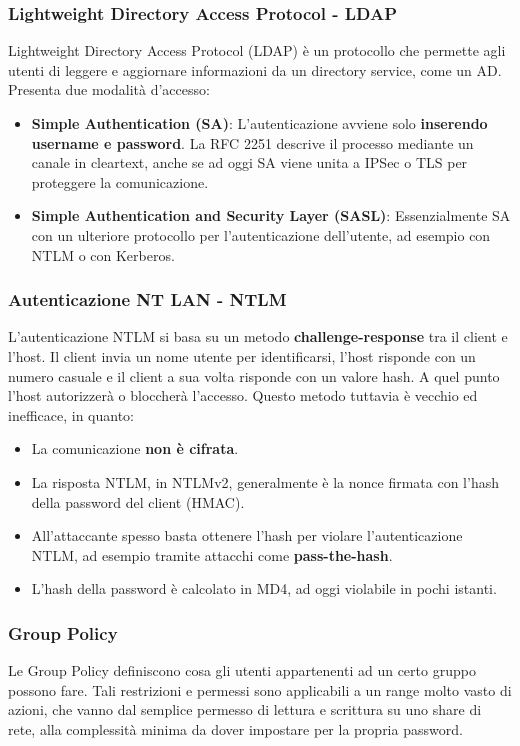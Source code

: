 \documentclass{article}
\begin{document}
\subsubsection{Lightweight Directory Access Protocol - LDAP}
Lightweight Directory Access Protocol (LDAP) è un protocollo che permette agli utenti di leggere e aggiornare informazioni da un directory 
service, come un AD. Presenta due modalità d'accesso:
\begin{itemize}
    \item \textbf{Simple Authentication (SA)}: L’autenticazione avviene solo \textbf{inserendo username e password}. La RFC 2251 descrive il processo mediante un canale in cleartext, anche se ad oggi SA viene unita a IPSec o TLS per proteggere la comunicazione.

    \item \textbf{Simple Authentication and Security Layer (SASL)}: Essenzialmente SA con un ulteriore protocollo per l’autenticazione dell’utente, ad esempio con NTLM o con Kerberos.
\end{itemize}

\subsubsection{Autenticazione NT LAN - NTLM}
L'autenticazione NTLM si basa su un metodo \textbf{challenge-response} tra il client e l'host. Il client invia un nome utente per identificarsi, l'host risponde con un numero casuale e il client a sua volta risponde con un valore hash. A quel punto l'host autorizzerà o bloccherà l'accesso. 
Questo metodo tuttavia è vecchio ed inefficace, in quanto:
\begin{itemize}
    \item La comunicazione \textbf{non è cifrata}.
    \item La risposta NTLM, in NTLMv2, generalmente è la nonce firmata con l'hash della password del client (HMAC).
    \item All'attaccante spesso basta ottenere l'hash per violare l'autenticazione NTLM, ad esempio tramite attacchi come \textbf{pass-the-hash}.
    \item L'hash della password è calcolato in MD4, ad oggi violabile in pochi istanti.
\end{itemize}

\subsubsection{Group Policy}
Le Group Policy definiscono cosa gli utenti appartenenti ad un certo gruppo possono fare. Tali restrizioni e permessi sono applicabili a un range molto vasto di azioni, che vanno dal semplice permesso di lettura e scrittura su uno share di rete, alla complessità minima da dover impostare per la propria password.
\end{document}
